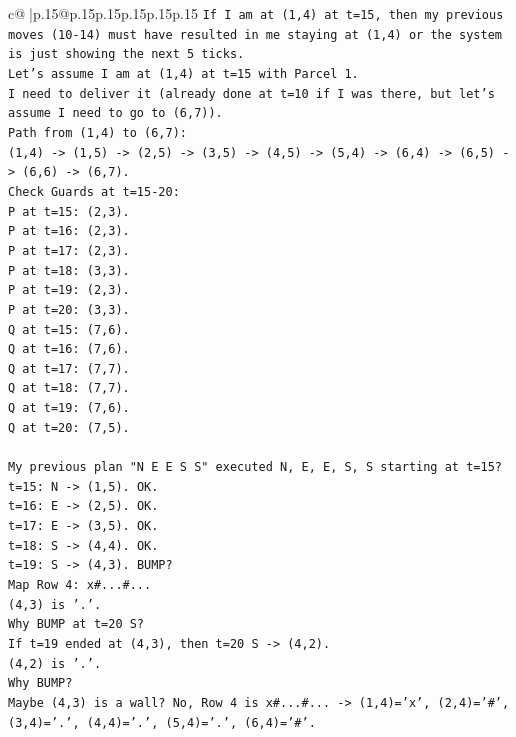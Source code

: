 \documentclass{article}
\begin{document}
{\begin{supertabular}{c@{$\;$}|p{.15\linewidth}@{}p{.15\linewidth}p{.15\linewidth}p{.15\linewidth}p{.15\linewidth}p{.15\linewidth}}
{{{\texttt{If I am at (1,4) at t=15, then my previous moves (10{-}14) must have resulted in me staying at (1,4) or the system is just showing the next 5 ticks.} \\
\texttt{Let's assume I am at (1,4) at t=15 with Parcel 1.} \\
\texttt{I need to deliver it (already done at t=10 if I was there, but let's assume I need to go to (6,7)).} \\
\texttt{Path from (1,4) to (6,7):} \\
\texttt{(1,4) {-}> (1,5) {-}> (2,5) {-}> (3,5) {-}> (4,5) {-}> (5,4) {-}> (6,4) {-}> (6,5) {-}> (6,6) {-}> (6,7).} \\
\texttt{Check Guards at t=15{-}20:} \\
\texttt{P at t=15: (2,3).} \\
\texttt{P at t=16: (2,3).} \\
\texttt{P at t=17: (2,3).} \\
\texttt{P at t=18: (3,3).} \\
\texttt{P at t=19: (2,3).} \\
\texttt{P at t=20: (3,3).} \\
\texttt{Q at t=15: (7,6).} \\
\texttt{Q at t=16: (7,6).} \\
\texttt{Q at t=17: (7,7).} \\
\texttt{Q at t=18: (7,7).} \\
\texttt{Q at t=19: (7,6).} \\
\texttt{Q at t=20: (7,5).} \\
\\ 
\texttt{My previous plan "N E E S S" executed N, E, E, S, S starting at t=15?} \\
\texttt{t=15: N {-}> (1,5). OK.} \\
\texttt{t=16: E {-}> (2,5). OK.} \\
\texttt{t=17: E {-}> (3,5). OK.} \\
\texttt{t=18: S {-}> (4,4). OK.} \\
\texttt{t=19: S {-}> (4,3). BUMP?} \\
\texttt{Map Row 4: x\#...\#...} \\
\texttt{(4,3) is '.'.} \\
\texttt{Why BUMP at t=20 S?} \\
\texttt{If t=19 ended at (4,3), then t=20 S {-}> (4,2).} \\
\texttt{(4,2) is '.'.} \\
\texttt{Why BUMP?} \\
\texttt{Maybe (4,3) is a wall? No, Row 4 is x\#...\#... {-}> (1,4)='x', (2,4)='\#', (3,4)='.', (4,4)='.', (5,4)='.', (6,4)='\#'.} \\
}}}
\end{supertabular}}
\end{document}
